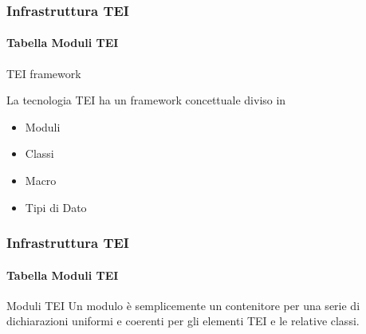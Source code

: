 




\begin{frame}
    \frametitle{Infrastruttura TEI}
    \framesubtitle{Tabella Moduli TEI}
    \addtocounter{nframe}{1}
    
    \begin{block}{TEI framework}
        
            La tecnologia TEI ha un framework concettuale diviso in
                \begin{itemize}
                    \item Moduli
                    \item Classi
                    \item Macro
                    \item Tipi di Dato
                \end{itemize}

    \end{block}
\end{frame}


\begin{frame}
    \frametitle{Infrastruttura TEI}
    \framesubtitle{Tabella Moduli TEI}
    \addtocounter{nframe}{1}
    
    \begin{block}{Moduli TEI}
        Un modulo è semplicemente un contenitore per una serie di dichiarazioni uniformi e coerenti per gli elementi TEI e le relative classi.
    \end{block}
\end{frame}

